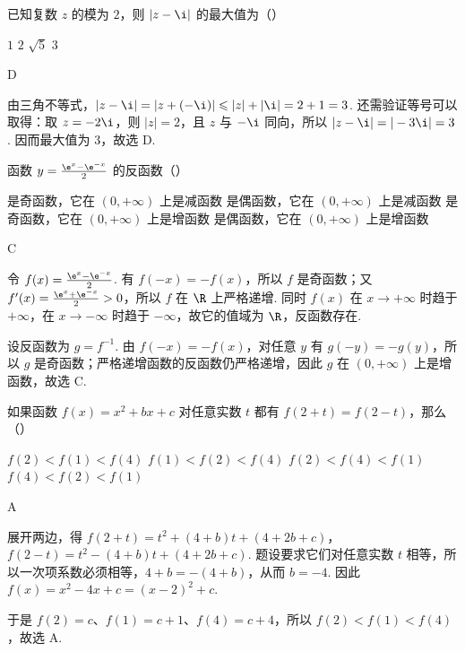 \begin{problem}
已知复数 \(z\) 的模为 \(2\)，则 \(|z-\i|\) 的最大值为（\quad）

\choices
    {\(1\)}
    {\(2\)}
    {\(\sqrt{5}\)}
    {\(3\)}

\begin{answer}
D
\end{answer}

\begin{solution}
由三角不等式，\(|z-\i|=|z+(-\i)|\leqslant|z|+|\i|=2+1=3\). 还需验证等号可以取得：取 \(z=-2\i\)，则 \(|z|=2\)，且 \(z\) 与 \(-\i\) 同向，所以
\(|z-\i|=|-3\i|=3\). 因而最大值为 \(3\)，故选 D.
\end{solution}
\end{problem}

\begin{problem}
函数 \(y=\frac{\e^x-\e^{-x}}{2}\) 的反函数（\quad）

\choices
    {是奇函数，它在 \((0,+\infty)\) 上是减函数}
    {是偶函数，它在 \((0,+\infty)\) 上是减函数}
    {是奇函数，它在 \((0,+\infty)\) 上是增函数}
    {是偶函数，它在 \((0,+\infty)\) 上是增函数}

\begin{answer}
C
\end{answer}

\begin{solution}
令 \(f(x)=\frac{\e^x-\e^{-x}}2\). 有 \(f(-x)=-f(x)\)，所以 \(f\) 是奇函数；又
\(f'(x)=\frac{\e^x+\e^{-x}}2>0\)，所以 \(f\) 在 \(\R\) 上严格递增. 同时 \(f(x)\) 在 \(x\to+\infty\) 时趋于 \(+\infty\)，在 \(x\to-\infty\) 时趋于 \(-\infty\)，故它的值域为 \(\R\)，反函数存在.

设反函数为 \(g=f^{-1}\). 由 \(f(-x)=-f(x)\)，对任意 \(y\) 有 \(g(-y)=-g(y)\)，所以 \(g\) 是奇函数；严格递增函数的反函数仍严格递增，因此 \(g\) 在 \((0,+\infty)\) 上是增函数，故选 C.
\end{solution}
\end{problem}

\begin{problem}
如果函数 \(f(x)=x^2+bx+c\) 对任意实数 \(t\) 都有 \(f(2+t)=f(2-t)\)，那么（\quad）

\choices
    {\(f(2)<f(1)<f(4)\)}
    {\(f(1)<f(2)<f(4)\)}
    {\(f(2)<f(4)<f(1)\)}
    {\(f(4)<f(2)<f(1)\)}

\begin{answer}
A
\end{answer}

\begin{solution}
展开两边，得
\(f(2+t)=t^2+(4+b)t+(4+2b+c)\)，
\(f(2-t)=t^2-(4+b)t+(4+2b+c)\). 题设要求它们对任意实数 \(t\) 相等，所以一次项系数必须相等，\(4+b=-(4+b)\)，从而 \(b=-4\). 因此
\(f(x)=x^2-4x+c=(x-2)^2+c\).

于是 \(f(2)=c\)、\(f(1)=c+1\)、\(f(4)=c+4\)，所以 \(f(2)<f(1)<f(4)\)，故选 A.
\end{solution}
\end{problem}

